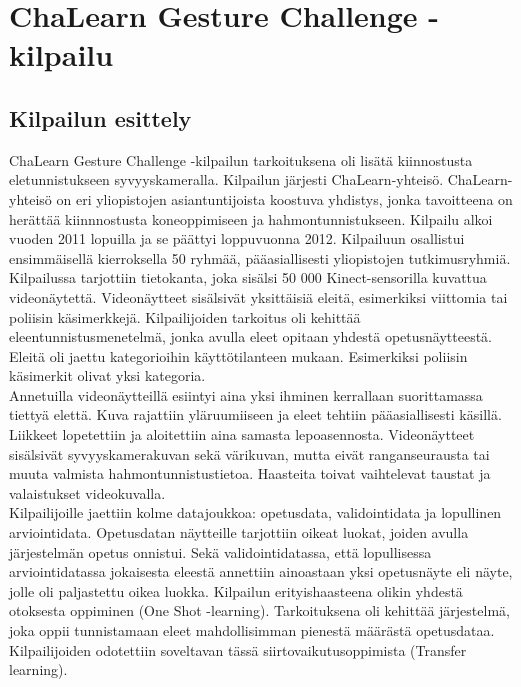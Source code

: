 \section{ChaLearn Gesture Challenge -kilpailu}
\label{ChaLearn Gesture Challenge -kilpailu}

\subsection{Kilpailun esittely}
ChaLearn Gesture Challenge -kilpailun tarkoituksena oli lisätä kiinnostusta eletunnistukseen syvyyskameralla.
Kilpailun järjesti ChaLearn-yhteisö. ChaLearn-yhteisö on eri yliopistojen asiantuntijoista koostuva yhdistys,
jonka tavoitteena on herättää kiinnnostusta koneoppimiseen ja hahmontunnistukseen.\citep{kilpailunnettisivut} Kilpailu alkoi vuoden 2011 lopuilla ja se päättyi loppuvuonna 2012. Kilpailuun osallistui ensimmäisellä kierroksella 50 ryhmää,
pääasiallisesti yliopistojen tutkimusryhmiä. Kilpailussa tarjottiin tietokanta, joka sisälsi 50 000 Kinect-sensorilla kuvattua videonäytettä. 
Videonäytteet sisälsivät yksittäisiä eleitä, esimerkiksi viittomia tai poliisin käsimerkkejä. Kilpailijoiden tarkoitus oli kehittää eleentunnistusmenetelmä, 
jonka avulla eleet opitaan yhdestä opetusnäytteestä. Eleitä oli jaettu kategorioihin käyttötilanteen mukaan. Esimerkiksi poliisin käsimerkit olivat yksi kategoria.
\citep{6239178} \\

Annetuilla videonäytteillä esiintyi aina yksi ihminen kerrallaan suorittamassa tiettyä elettä. Kuva rajattiin yläruumiiseen ja eleet tehtiin
pääasiallisesti käsillä. Liikkeet lopetettiin ja aloitettiin aina samasta lepoasennosta. Videonäytteet sisälsivät syvyyskamerakuvan sekä värikuvan, 
mutta eivät ranganseurausta tai muuta valmista hahmontunnistustietoa. Haasteita toivat vaihtelevat taustat ja valaistukset videokuvalla.  \citep{6239178}\\

Kilpailijoille jaettiin kolme datajoukkoa: opetusdata, validointidata ja lopullinen arviointidata. 
Opetusdatan näytteille tarjottiin oikeat luokat, joiden avulla järjestelmän opetus onnistui.
Sekä validointidatassa, että lopullisessa arviointidatassa jokaisesta eleestä annettiin ainoastaan yksi opetusnäyte eli näyte,
jolle oli paljastettu oikea luokka. Kilpailun erityishaasteena olikin yhdestä otoksesta oppiminen (One Shot -learning). 
Tarkoituksena oli kehittää järjestelmä, joka oppii tunnistamaan eleet mahdollisimman pienestä määrästä opetusdataa. 
Kilpailijoiden odotettiin soveltavan tässä siirtovaikutusoppimista (Transfer learning). \citep{6239178} \\

